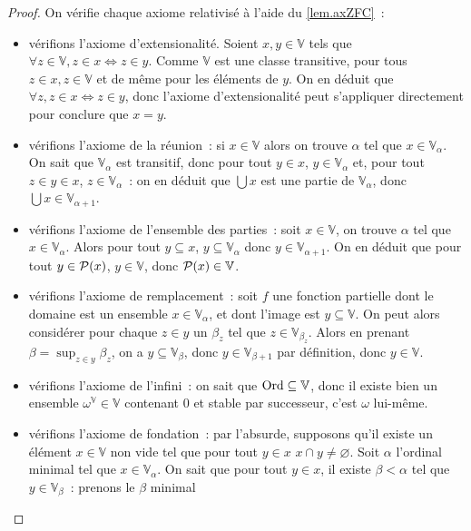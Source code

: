 \begin{proof}
  On vérifie chaque axiome relativisé à l'aide du \cref{lem.axZFC}~:
  \begin{itemize}
  \item vérifions l'axiome d'extensionalité. Soient $x,y\in \mathbb V$ tels que
    $\forall z\in \mathbb V, z\in x\iff z \in y$. Comme $\mathbb V$ est une
    classe transitive, pour tous $z\in x, z\in \mathbb V$ et de même pour les
    éléments de $y$. On en déduit que $\forall z, z\in x \iff z \in y$, donc
    l'axiome d'extensionalité peut s'appliquer directement pour conclure que
    $x = y$.
  \item vérifions l'axiome de la réunion~: si $x\in \mathbb V$ alors on trouve
    $\alpha$ tel que $x \in \mathbb V_\alpha$. On sait que $\mathbb V_\alpha$ est
    transitif, donc pour tout $y \in x$, $y \in \mathbb V_\alpha$ et, pour tout
    $z \in y \in x$, $z \in \mathbb V_\alpha$~: on en déduit que $\bigcup x$
    est une partie de $\mathbb V_\alpha$, donc
    $\bigcup x\in \mathbb V_{\alpha + 1}$.
  \item vérifions l'axiome de l'ensemble des parties~: soit $x\in \mathbb V$,
    on trouve $\alpha$ tel que $x \in\mathbb V_\alpha$. Alors pour tout
    $y\subseteq x$, $y\subseteq \mathbb V_\alpha$ donc
    $y\in\mathbb V_{\alpha +1}$. On en déduit que pour tout $y\in \mathcal{P}(x)$,
    $y\in \mathbb V$, donc $\mathcal{P}(x)\in\mathbb V$.
  \item vérifions l'axiome de remplacement~: soit $f$ une fonction partielle
    dont le domaine est un ensemble $x \in \mathbb V_\alpha$, et dont l'image
    est $y \subseteq \mathbb V$. On peut alors considérer pour chaque $z \in y$
    un $\beta_z$ tel que $z \in \mathbb V_{\beta_z}$. Alors en prenant
    $\beta = \sup_{z\in y} \beta_z$, on a $y \subseteq \mathbb V_\beta$, donc
    $y\in \mathbb V_{\beta + 1}$ par définition, donc $y \in \mathbb V$.
  \item vérifions l'axiome de l'infini~: on sait que $\operatorname{Ord}\subseteq\mathbb V$,
    donc il existe bien un ensemble $\omega^\mathbb V \in \mathbb V$
    contenant $0$ et stable par successeur, c'est $\omega$ lui-même.
  \item vérifions l'axiome de fondation~: par l'absurde, supposons qu'il existe
    un élément $x \in \mathbb V$ non vide tel que pour tout $y \in x$
    $x \cap y \neq \varnothing$. Soit $\alpha$ l'ordinal minimal tel que
    $x \in \mathbb V_\alpha$. On sait que pour tout $y \in x$, il existe
    $\beta < \alpha$ tel que $y \in \mathbb V_\beta$~: prenons le $\beta$ minimal

\end{itemize}
\end{proof}
